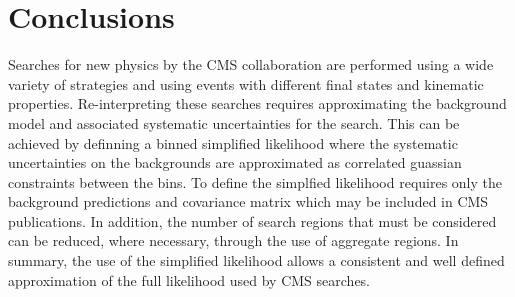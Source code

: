 \section{Conclusions}
\label{sec:conclusions}
Searches for new physics by the CMS collaboration are performed using a wide variety of 
strategies and using events with different final states and kinematic properties. 
Re-interpreting these searches requires approximating the background model
and associated systematic uncertainties for the search. This can be 
achieved by definning a binned simplified likelihood where the systematic 
uncertainties on the backgrounds are approximated as correlated guassian constraints between the bins. 
To define the simplfied likelihood requires only the background predictions and covariance matrix which may be 
included in CMS publications. In addition, the number of search regions that must
be considered can be reduced, where necessary, through the use of aggregate regions. In summary, 
the use of the simplified likelihood allows a consistent and well defined approximation of the 
full likelihood used by CMS searches.



